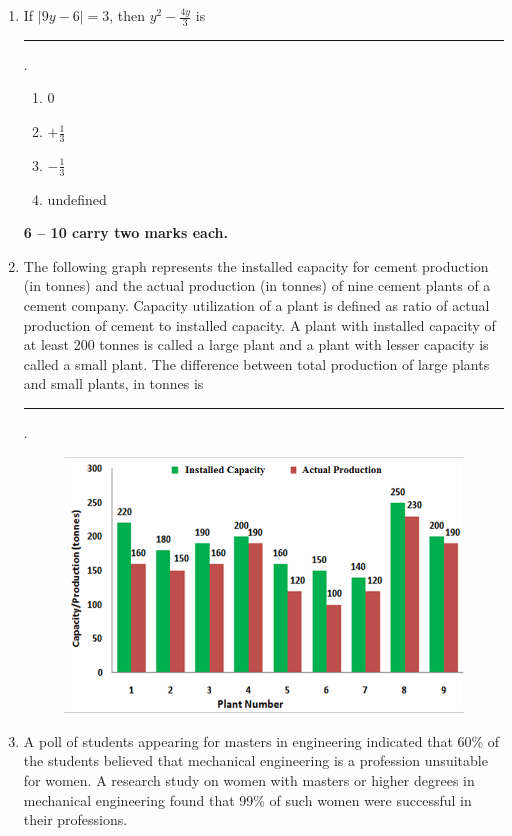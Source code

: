 \documentclass[journal,12pt,onecolumn]{IEEEtran}
\begin{document}
\begin{enumerate}[label=\arabic*.]
\item If $|9y-6|=3$, then $y^2 -\frac{4y}{3}$ is \rule{2.5cm}{0.1pt}.
\begin{multicols}{4}
\begin{enumerate}[label=(\Alph*)]
\item 0
\item $+\frac{1}{3}$
\item $-\frac{1}{3}$
\item undefined
\end{enumerate}
\end{multicols}

\noindent \textbf{ 6 --  10 carry two marks each.}

\item The following graph represents the installed capacity for cement production (in tonnes) and the actual production (in tonnes) of nine cement plants of a cement company. Capacity utilization of a plant is defined as ratio of actual production of cement to installed capacity. A plant with installed capacity of at least 200 tonnes is called a large plant and a plant with lesser capacity is called a small plant. The difference between total production of large plants and small plants, in tonnes is \rule{3cm}{0.1pt}.

\begin{figure}[H]
    \centering
    \includegraphics[width=0.7\columnwidth]{FIG/GA-6.png}
    \caption*{}
    \label{fig:GA-6}
\end{figure}

\item A poll of students appearing for masters in engineering indicated that 60\% of the students believed that mechanical engineering is a profession unsuitable for women. A research study on women with masters or higher degrees in mechanical engineering found that 99\% of such women were successful in their professions.


\end{enumerate}
\end{document}
